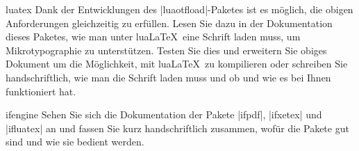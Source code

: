 \documentclass[
	blatt=11,
	ausgabe=25.\,06.\,2010,
	rückgabe=02.\,07.\,2010
]{lcourse-hd}
\begin{document}
\begin{expertexercise}[
  name=Wunderwaffe,
  abgabe = Quelltext per Mail{,} das fertige Dokument als Ausdruck.
]{luatex}
Dank der Entwicklungen des |luaotfload|-Paketes ist es möglich, die obigen Anforderungen gleichzeitig zu erfüllen. Lesen Sie dazu in der Dokumentation dieses Paketes, wie man unter lua\LaTeX\ eine Schrift laden muss, um Mikrotypographie zu unterstützen. Testen Sie dies und erweitern Sie obiges Dokument um die Möglichkeit, mit lua\LaTeX\ zu kompilieren oder schreiben Sie handschriftlich, wie man die Schrift laden muss und ob und wie es bei Ihnen funktioniert hat.

\end{expertexercise}

\begin{exercise}[
  name=Maschinenfragen,
  punkte=3,
  abgabe = Handschriftliche Zusammenfassung der Paketdokumentationen.
]{ifengine}
Sehen Sie sich die Dokumentation der Pakete |ifpdf|, |ifxetex| und |ifluatex| an und fassen Sie kurz handschriftlich zusammen, wofür die Pakete gut sind und wie sie bedient werden.
\end{exercise}
\end{document}
